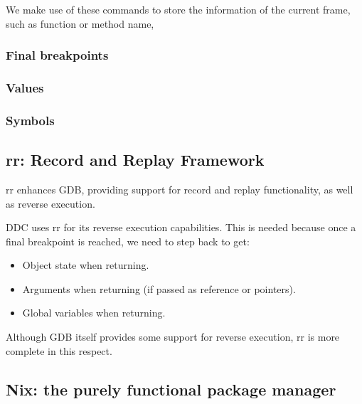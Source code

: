 We make use of these commands to store the information of the current frame, such as function or method name, 
\subsubsection{Final breakpoints}
\subsubsection{Values}
\subsubsection{Symbols}
\subsection{rr: Record and Replay Framework}
rr enhances GDB, providing support for record and replay functionality, as well as reverse execution.

DDC uses rr for its reverse execution capabilities. This is needed because once a final breakpoint is reached, we need to step back to get:
\begin{itemize}
    \item Object state when returning.
    \item Arguments when returning (if passed as reference or pointers).
    \item Global variables when returning.
\end{itemize}
Although GDB itself provides some support for reverse execution, rr is more complete in this respect.
\subsection{Nix: the purely functional package manager}